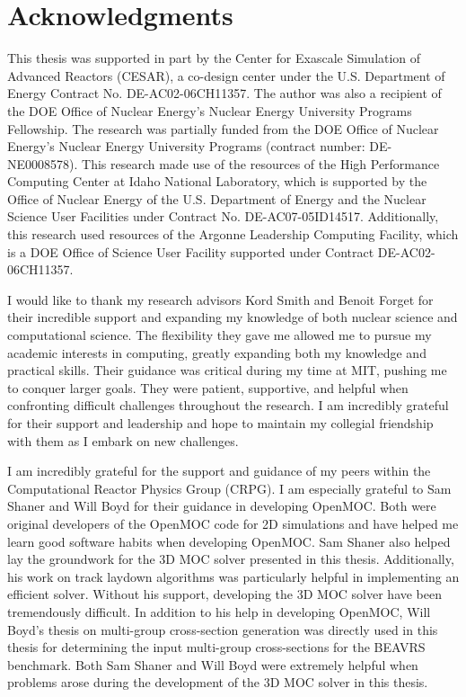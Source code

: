 \section*{Acknowledgments}

This thesis was supported in part by the Center for Exascale Simulation of Advanced Reactors (CESAR), a co-design center under the U.S. Department of Energy Contract No. DE-AC02-06CH11357. The author was also a recipient of the DOE Office of Nuclear Energy's Nuclear Energy University Programs Fellowship.  The research was partially funded from the DOE Office of Nuclear Energy's Nuclear Energy University Programs (contract number: DE-NE0008578). This research made use of the resources of the High Performance Computing Center at Idaho National Laboratory, which is supported by the Office of Nuclear Energy of the U.S. Department of Energy and the Nuclear Science User Facilities under Contract No. DE-AC07-05ID14517. Additionally, this research used resources of the Argonne Leadership Computing Facility, which is a DOE Office of Science User Facility supported under Contract DE-AC02-06CH11357.

I would like to thank my research advisors Kord Smith and Benoit Forget for their incredible support and expanding my knowledge of both nuclear science and computational science. The flexibility they gave me allowed me to pursue my academic interests in computing, greatly expanding both my knowledge and practical skills. Their guidance was critical during my time at MIT, pushing me to conquer larger goals. They were patient, supportive, and helpful when confronting difficult challenges throughout the research. I am incredibly grateful for their support and leadership and hope to maintain my collegial friendship with them as I embark on new challenges.

I am incredibly grateful for the support and guidance of my peers within the Computational Reactor Physics Group (CRPG). I am especially grateful to Sam Shaner and Will Boyd for their guidance in developing OpenMOC. Both were original developers of the OpenMOC code for 2D simulations and have helped me learn good software habits when developing OpenMOC. Sam Shaner also helped lay the groundwork for the 3D MOC solver presented in this thesis. Additionally, his work on track laydown algorithms was particularly helpful in implementing an efficient solver. Without his support, developing the 3D MOC solver have been tremendously difficult. In addition to his help in developing OpenMOC, Will Boyd's thesis on multi-group cross-section generation was directly used in this thesis for determining the input multi-group cross-sections for the BEAVRS benchmark. Both Sam Shaner and Will Boyd were extremely helpful when problems arose during the development of the 3D MOC solver in this thesis.

